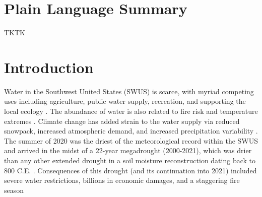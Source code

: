 \documentclass[draft]{agujournal2019}
\begin{document}
\begin{abstract}
TKTK
\end{abstract}

\section*{Plain Language Summary}
TKTK


%
%

\section{Introduction}

Water in the Southwest United States (SWUS) is scarce, with myriad competing uses including agriculture, public water supply, recreation, and supporting the local ecology \cite{dettinger2015}.
The abundance of water is also related to fire risk and temperature extremes \cite{holden2025,hirschi2011}. 
Climate change has added strain to the water supply via reduced snowpack, increased atmospheric demand, and increased precipitation variability \cite{wieder2022,albano2022,pendergrass2017}.
The summer of 2020 was the driest of the meteorological record within the SWUS \cite{mankin2021,hoell2022} and arrived in the midst of a 22-year megadrought (2000-2021), which was drier than any other extended drought in a soil moisture reconstruction dating back to 800 C.E. \cite{williams2022}.
Consequences of this drought (and its continuation into 2021) included severe water restrictions, billions in economic damages, and a staggering fire season \cite{higuera2021,jiang2025}
\end{document}
